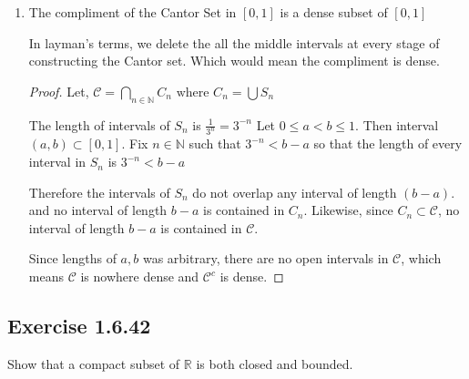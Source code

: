 \documentclass{tufte-book}
\theoremstyle{mytheoremstyle}
\theoremstyle{mylemstyle}
\theoremstyle{mydefstyle}
\begin{document}
\begin{enumerate}
\begin{proof}
Let $C_n = \bigcup S_m$ where $S_m$ is a finite number of closed sets. For any $x \in S_m$ let $\bar{x}$ be the right end point of $S_m$, unless $x = \bar{x}$ then let $\bar{x}$ be the left endpoint. By construction, each subinterval of $S_m$ has length $\frac{1}{3^n}$.  Which means $|x - x_m| < \frac{1}{3^n}$.

This implies that the sequence of $x_m$ converges to $x$ and such is an accumulation point.  Since we chose $x$ to be arbitrary, this applies to all $x \in \mathcal{C}$.
\end{proof}

\item The compliment of the Cantor Set in $[0,1]$ is a dense subset of $[0,1]$

In layman's terms, we delete the all the middle intervals at every stage of constructing the Cantor set.  Which would mean the compliment is dense.

\begin{proof} Let, $\mathcal{C} = \bigcap\limits_{n \in \mathbb{N}}C_n \text{ where }C_n = \bigcup S_n$

The length of intervals of $S_n$ is $\frac{1}{3^n} = 3^{-n}$ Let $0 \leq a < b \leq 1$. Then interval $(a, b) \subset [0,1]$.  Fix $n \in \mathbb{N}$ such that $3^{-n} < b-a$ so that the length of every interval in $S_n$ is $3^{-n} < b-a$

Therefore the intervals of $S_n$ do not overlap any interval of length $(b-a)$.  and no interval of length $b-a$ is contained in $C_n$.  Likewise, since $C_n \subset \mathcal{C}$, no interval of length $b-a$ is contained in $\mathcal{C}$.

Since lengths of $a,b$ was arbitrary, there are no open intervals in $\mathcal{C}$, which means $\mathcal{C}$ is nowhere dense and $\mathcal{C}^c$ is dense.
\end{proof}

\end{enumerate}

\subsection{Exercise 1.6.42}
Show that a compact subset of $\mathbb{R}$ is both closed and bounded.
\end{document}
